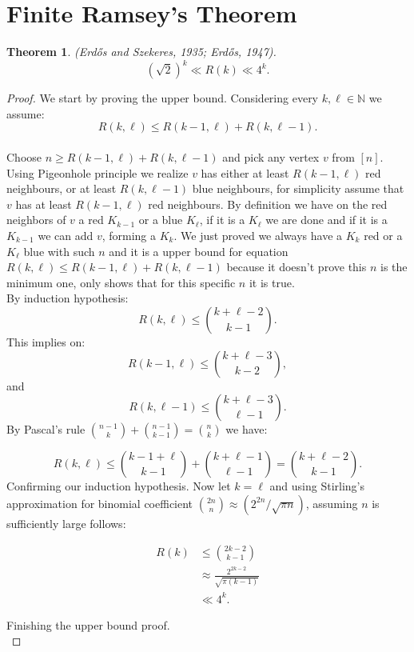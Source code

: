 \documentclass[12pt,twoside,a4paper]{book}
\numberwithin{equation}{section}
\newtheorem{theorem}             {Theorem}[section]
\theoremstyle{remark}
\begin{document}
\section{Finite Ramsey's Theorem}

\begin{theorem}\label{thm:ErdosandS}
(Erd\H{o}s and Szekeres, 1935; Erd\H{o}s, 1947).\\
$$(\sqrt{2})^k \ll R(k) \ll 4^k.$$
\end{theorem}
\begin{proof} We start by proving the upper bound. Considering every $k, \ell \in \mathbb{N}$ we assume:\\
$$R(k,\ell ) \leq R(k-1,\ell )+R(k,\ell-1).$$\\
Choose $n \geq R(k-1,\ell) + R(k, \ell-1)$ and pick any vertex $v$ from $[n]$. Using Pigeonhole principle we realize $v$ has either at least $R(k-1,\ell)$ red neighbours, or at least $R(k,\ell-1)$ blue neighbours, for simplicity assume that $v$ has at least $R(k-1,\ell)$ red neighbours. By definition we have on the red neighbors of $v$ a red $K_{k-1}$ or a blue $K_{\ell}$, if it is a $K_{\ell}$ we are done and if it is a $K_{k-1}$ we can add $v$, forming a $K_k$. We just proved we always have a $K_k$ red or a $K_{\ell}$ blue with such $n$ and it is a upper bound for equation $R(k,\ell) \leq R(k-1,\ell)+R(k,\ell-1)$ because it doesn't prove this $n$ is the minimum one, only shows that for this specific $n$ it is true.\\
By induction hypothesis:
$$R(k,\ell) \leq \binom{k+\ell - 2}{k - 1}.$$
This implies on:
$$R(k-1,\ell)\leq \binom{k+\ell -3}{k-2},$$ and $$R(k,\ell-1)\leq \binom{k+\ell-3}{\ell-1}.$$
By Pascal's rule $\binom{n-1}{k} + \binom{n-1}{k-1} = \binom{n}{k}$ we have:

$$R(k,\ell)\leq \binom{k-1+\ell}{k-1} + \binom{k+\ell-1}{\ell-1} = \binom{k+ \ell -2}{k-1}.$$
Confirming our induction hypothesis. Now let $k = \ell$ and using Stirling's approximation for binomial coefficient $\binom{2n}{n} \approx (2^{2n}/\sqrt{\pi n})$, assuming $n$ is sufficiently large follows:

\begin{align*}
R(k) &\leq \binom{2k -2}{k-1}\\
& \approx \frac{2^{2k-2}}{\sqrt{\pi (k-1)}}\\
& \ll 4^k.
\end{align*}

Finishing the upper bound proof.\\


\end{proof}
\end{document}
